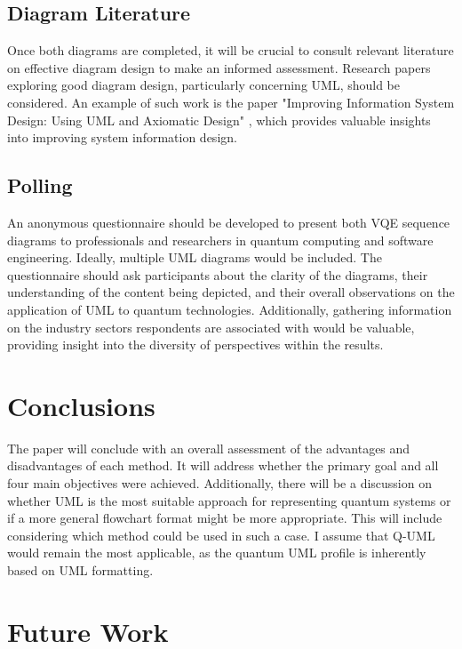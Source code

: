 \documentclass{article}
\begin{document}
{\subsection{Diagram Literature}

Once both diagrams are completed, it will be crucial to consult relevant literature on effective diagram design to make an informed assessment. Research papers exploring good diagram design, particularly concerning UML, should be considered. An example of such work is the paper "Improving Information System Design: Using UML and Axiomatic Design" \cite{CAVIQUE2022103569}, which provides valuable insights into improving system information design.

\subsection{Polling}

An anonymous questionnaire should be developed to present both VQE sequence diagrams to professionals and researchers in quantum computing and software engineering. Ideally, multiple UML diagrams would be included. The questionnaire should ask participants about the clarity of the diagrams, their understanding of the content being depicted, and their overall observations on the application of UML to quantum technologies. Additionally, gathering information on the industry sectors respondents are associated with would be valuable, providing insight into the diversity of perspectives within the results.

\section{Conclusions}

The paper will conclude with an overall assessment of the advantages and disadvantages of each method. It will address whether the primary goal and all four main objectives were achieved. Additionally, there will be a discussion on whether UML is the most suitable approach for representing quantum systems or if a more general flowchart format might be more appropriate. This will include considering which method could be used in such a case. I assume that Q-UML would remain the most applicable, as the quantum UML profile is inherently based on UML formatting.

\section{Future Work}

}
\end{document}
